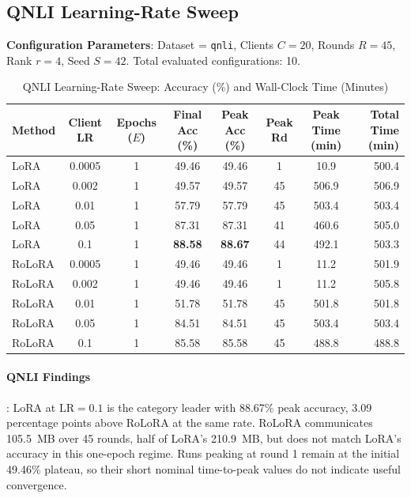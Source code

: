 \documentclass[10pt,a4paper]{article}
\begin{document}
\clearpage
\subsection{QNLI Learning-Rate Sweep}

\textbf{Configuration Parameters}: Dataset = \texttt{qnli}, Clients $C = 20$, Rounds $R = 45$, Rank $r = 4$, Seed $S = 42$. Total evaluated configurations: 10.

\begin{table}[H]
\centering
\caption{QNLI Learning-Rate Sweep: Accuracy (\%) and Wall-Clock Time (Minutes)}
\label{tab:lr4_e1_qnli}
\scriptsize
\setlength{\tabcolsep}{3.5pt}
\begin{tabular*}{\textwidth}{@{\extracolsep{\fill}}lccccccr@{}}
\toprule
\textbf{Method} & \textbf{Client LR} & \textbf{Epochs ($E$)} & \textbf{Final Acc (\%)} & \textbf{Peak Acc (\%)} & \textbf{Peak Rd} & \textbf{Peak Time (min)} & \textbf{Total Time (min)} \\
\midrule
LoRA & 0.0005 & 1 & 49.46 & 49.46 & 1 & 10.9 & 500.4 \\
LoRA & 0.002 & 1 & 49.57 & 49.57 & 45 & 506.9 & 506.9 \\
LoRA & 0.01 & 1 & 57.79 & 57.79 & 45 & 503.4 & 503.4 \\
LoRA & 0.05 & 1 & 87.31 & 87.31 & 41 & 460.6 & 505.0 \\
LoRA & 0.1 & 1 & \textbf{88.58} & \textbf{88.67} & 44 & 492.1 & 503.3 \\
\midrule
RoLoRA & 0.0005 & 1 & 49.46 & 49.46 & 1 & 11.2 & 501.9 \\
RoLoRA & 0.002 & 1 & 49.46 & 49.46 & 1 & 11.2 & 505.8 \\
RoLoRA & 0.01 & 1 & 51.78 & 51.78 & 45 & 501.8 & 501.8 \\
RoLoRA & 0.05 & 1 & 84.51 & 84.51 & 45 & 503.4 & 503.4 \\
RoLoRA & 0.1 & 1 & 85.58 & 85.58 & 45 & 488.8 & 488.8 \\
\bottomrule
\end{tabular*}
\end{table}

\paragraph{QNLI Findings}:
LoRA at $\mathrm{LR}=0.1$ is the category leader with 88.67\% peak accuracy, 3.09 percentage points above RoLoRA at the same rate.
RoLoRA communicates 105.5~MB over 45 rounds, half of LoRA's 210.9~MB, but does not match LoRA's accuracy in this one-epoch regime.
Runs peaking at round 1 remain at the initial 49.46\% plateau, so their short nominal time-to-peak values do not indicate useful convergence.
\end{document}
